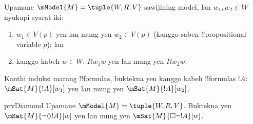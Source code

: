 \documentclass[../../../include/open-logic-section]{subfiles}
\begin{document}
\begin{prob}
  Upamane $\mModel{M} = \tuple{W, R, V}$ sawijining model, lan $w_1, w_2 \in
  W$ nyukupi syarat iki:
  \begin{enumerate}
  \item $w_1 \in V(p)$ yen lan mung yen $w_2 \in V(p)$ (kanggo saben !!{propositional variable} $p$); lan
  \item kanggo kabeh $w \in W$: $Rw_1w$ yen lan mung yen $Rw_2w$.
  \end{enumerate}
  Kanthi induksi marang !!{formula}s, buktekna yen kanggo kabeh !!{formula}s $!A$:
  $\mSat{M}{!A}[w_1]$ yen lan mung yen $\mSat{M}{!A}[w_2]$.
\end{prob}

\begin{probtag}{prvDiamond}
  Upamane $\mModel{M} = \tuple{W, R, V}$. Buktekna yen
  $\mSat{M}{\lnot\Diamond !A}[w]$ yen lan mung yen
  $\mSat{M}{\Box\lnot!A}[w]$.
\end{probtag}
\end{document}
